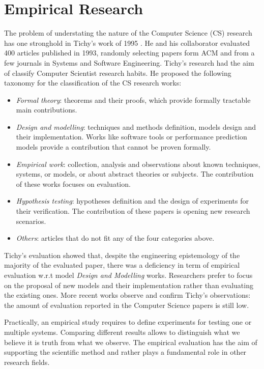 \section{Empirical Research}\label{sec:empirical-research}

The problem of understating the nature of the Computer Science (CS) research has one stronghold in Tichy's work of 1995 \cite{Tichy:1995:EEC:209090.209093}. He and his collaborator evaluated 400 articles published in 1993, randomly selecting papers form ACM and from a few journals in Systems and Software Engineering. Tichy's research had the aim of classify Computer Scientist research habits. He proposed the following taxonomy \cite{Tichy:1995:EEC:209090.209093} for the classification of the CS research works:
\begin{itemize}
\item \textit{Formal theory}: theorems and their proofs, which provide formally tractable main contributions. 
\item \textit{Design and modelling}:  techniques and methods definition, models design and their implementation. Works like  software tools or performance prediction models provide a contribution that cannot be proven formally.
\item \textit{Empirical work}: collection, analysis and observations about known techniques, systems, or models, or about abstract theories or subjects. The contribution of these works focuses on evaluation.
\item \textit{Hypothesis testing}: hypotheses definition and the design of experiments for their verification. The contribution of these papers is opening new research scenarios.
\item \textit{Others}: articles that do not fit any of the four categories above.
\end{itemize}

Tichy's evaluation showed that, despite the engineering epistemology of the majority of the evaluated paper, there was a deficiency in term of empirical evaluation w.r.t model \textit{Design and Modelling} works. Researchers prefer to focus on the proposal of new models and their implementation rather than evaluating the existing ones. More recent works \cite{Wainer:2009:EEC:1518331.1518552} observe and confirm Tichy's observations: the amount of evaluation reported in the Computer Science papers is still low.

Practically, an empirical study requires to define experiments for testing one or multiple systems. Comparing different results allows to distinguish what we believe it is truth from what we observe. The empirical evaluation has the aim of supporting the scientific method and rather plays a fundamental role in other research fields.

